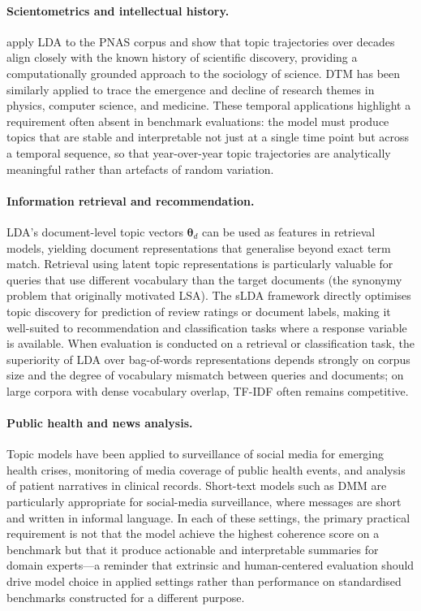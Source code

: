 \documentclass[11pt,a4paper]{article}
\newcommand{\vect}[1]{\boldsymbol{#1}}
\begin{document}
\paragraph{Scientometrics and intellectual history.}
\textcite{griffiths2004finding} apply LDA to the PNAS corpus and show
that topic trajectories over decades align closely with the known
history of scientific discovery, providing a computationally grounded
approach to the sociology of science.
DTM has been similarly applied to trace the emergence and decline of
research themes in physics, computer science, and medicine.
These temporal applications highlight a requirement often absent in
benchmark evaluations: the model must produce topics that are stable
and interpretable not just at a single time point but across a
temporal sequence, so that year-over-year topic trajectories are
analytically meaningful rather than artefacts of random variation.

\paragraph{Information retrieval and recommendation.}
LDA's document-level topic vectors $\vect{\theta}_{d}$ can be used as
features in retrieval models, yielding document representations that
generalise beyond exact term match.
Retrieval using latent topic representations is particularly valuable
for queries that use different vocabulary than the target documents
(the synonymy problem that originally motivated LSA).
The sLDA framework \parencite{blei2007supervised} directly optimises
topic discovery for prediction of review ratings or document labels,
making it well-suited to recommendation and classification tasks where
a response variable is available.
When evaluation is conducted on a retrieval or classification task,
the superiority of LDA over bag-of-words representations depends
strongly on corpus size and the degree of vocabulary mismatch between
queries and documents; on large corpora with dense vocabulary overlap,
TF-IDF often remains competitive.

\paragraph{Public health and news analysis.}
Topic models have been applied to surveillance of social media for
emerging health crises, monitoring of media coverage of public health
events, and analysis of patient narratives in clinical records.
Short-text models such as DMM \parencite{yin2014dirichlet} are
particularly appropriate for social-media surveillance, where messages
are short and written in informal language.
In each of these settings, the primary practical requirement is not
that the model achieve the highest coherence score on a benchmark
but that it produce actionable and interpretable summaries for domain
experts---a reminder that extrinsic and human-centered evaluation
should drive model choice in applied settings rather than
performance on standardised benchmarks constructed for a different purpose.
\end{document}
